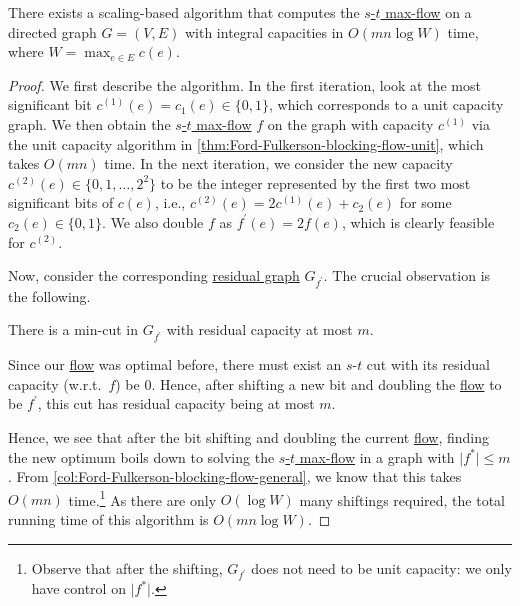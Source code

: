 \begin{theorem}\label{thm:Ford-Fulkerson-scaling}
	There exists a scaling-based algorithm that computes the \hyperref[prb:s-t-max-flow]{\(s\)-\(t\) max-flow} on a directed graph \(G = (V, E)\) with integral capacities in \(O(mn \log W)\) time, where \(W = \max _{e \in E} c(e)\).
\end{theorem}
\begin{proof}
	We first describe the algorithm. In the first iteration, look at the most significant bit \(c^{(1)}(e) = c_1(e) \in \{ 0, 1 \} \), which corresponds to a unit capacity graph. We then obtain the \hyperref[prb:s-t-max-flow]{\(s\)-\(t\) max-flow} \(f\) on the graph with capacity \(c^{(1)}\) via the unit capacity algorithm in \autoref{thm:Ford-Fulkerson-blocking-flow-unit}, which takes \(O(mn)\) time. In the next iteration, we consider the new capacity \(c^{(2)}(e) \in \{ 0, 1, \dots , 2^2 \} \) to be the integer represented by the first two most significant bits of \(c(e)\), i.e., \(c^{(2)} (e) = 2 c^{(1)}(e) + c_2(e)\) for some \(c_2(e) \in \{ 0, 1 \} \). We also double \(f\) as \(f^{\prime} (e) = 2 f(e)\), which is clearly feasible for \(c^{(2)}\).

	Now, consider the corresponding \hyperref[def:residual-graph]{residual graph} \(G_{f^{\prime} }\). The crucial observation is the following.

	\begin{claim}
		There is a min-cut in \(G_{f^{\prime} }\) with residual capacity at most \(m\).
	\end{claim}
	\begin{explanation}
		Since our \hyperref[def:flow]{flow} was optimal before, there must exist an \(s\)-\(t\) cut with its residual capacity (w.r.t.\ \(f\)) be \(0\). Hence, after shifting a new bit and doubling the \hyperref[def:flow]{flow} to be \(f^{\prime} \), this cut has residual capacity being at most \(m\).
	\end{explanation}

	Hence, we see that after the bit shifting and doubling the current \hyperref[def:flow]{flow}, finding the new optimum boils down to solving the \hyperref[prb:s-t-max-flow]{\(s\)-\(t\) max-flow} in a graph with \(\lvert f^{\ast} \rvert \leq m\). From \autoref{col:Ford-Fulkerson-blocking-flow-general}, we know that this takes \(O(mn)\) time.\footnote{Observe that after the shifting, \(G_{f^{\prime} }\) does not need to be unit capacity: we only have control on \(\lvert f^{\ast} \rvert \).} As there are only \(O(\log W)\) many shiftings required, the total running time of this algorithm is \(O(mn \log W)\).
\end{proof}

